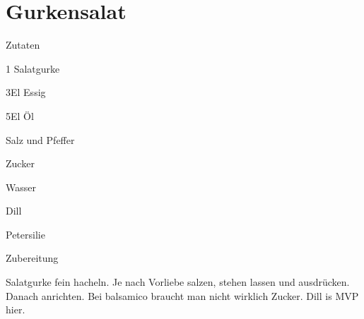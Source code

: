 \chapter*{Gurkensalat}
\begin{multicols}{2}
 {\Large Zutaten}
 \begin{Zutaten}
		\item 1 Salatgurke
		\item 3El Essig
		\item 5El Öl
		\item Salz und Pfeffer
		\item Zucker
		\item Wasser
		\item Dill
		\item Petersilie
					
		
\end{Zutaten}
\columnbreak
\end{multicols}

{\Large Zubereitung} \newline
\begin{addmargin}[1cm]{0cm}
	Salatgurke fein hacheln.
	Je nach Vorliebe salzen, stehen lassen und ausdrücken.\newline
	Danach anrichten. Bei balsamico braucht man nicht wirklich Zucker.\newline
	Dill is MVP hier.
	
\end{addmargin}
